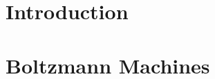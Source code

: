 \documentclass[a4paper,12pt,oneside,onecolumn,final,fleqn]{config/repUERJ}
\begin{document}
%

\mainmatter




\chapter*{Introduction}
\label{ch:0}


%  
\begin{figure}[htb]{\textwidth}
%  
  
\end{figure}

\chapter{Boltzmann Machines}
\label{ch:1}

%
%
%
%
%
%
%
%
%
\end{document}

